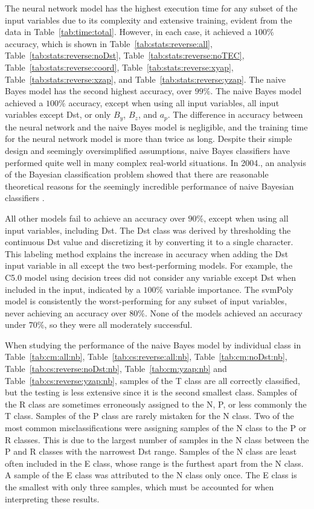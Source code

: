 \documentclass[preprint,12pt]{elsarticle}
\begin{document}
The neural network model has the highest execution time for any subset of the input variables due to its complexity and extensive training, evident from the data in Table~\ref{tab:time:total}. However, in each case, it achieved a $100\%$ accuracy, which is shown in Table~\ref{tab:stats:reverse:all}, Table~\ref{tab:stats:reverse:noDst}, Table~\ref{tab:stats:reverse:noTEC}, Table~\ref{tab:stats:reverse:coord}, Table~\ref{tab:stats:reverse:xyap}, Table~\ref{tab:stats:reverse:xzap}, and Table~\ref{tab:stats:reverse:yzap}. The naive Bayes model has the second highest accuracy, over $99\%$. The naive Bayes model achieved a $100\%$ accuracy, except when using all input variables, all input variables except Dst, or only $B_{y}$, $B_{z}$, and $a_{p}$. The difference in accuracy between the neural network and the naive Bayes model is negligible, and the training time for the neural network model is more than twice as long. Despite their simple design and seemingly oversimplified assumptions, naive Bayes classifiers have performed quite well in many complex real-world situations. In 2004., an analysis of the Bayesian classification problem showed that there are reasonable theoretical reasons for the seemingly incredible performance of naive Bayesian classifiers \cite{Zhang2004}.

All other models fail to achieve an accuracy over $90\%$, except when using all input variables, including Dst. The Dst class was derived by thresholding the continuous Dst value and discretizing it by converting it to a single character. This labeling method explains the increase in accuracy when adding the Dst input variable in all except the two best-performing models. For example, the C5.0 model using decision trees did not consider any variable except Dst when included in the input, indicated by a $100\%$ variable importance. The svmPoly model is consistently the worst-performing for any subset of input variables, never achieving an accuracy over $80\%$. None of the models achieved an accuracy under $70\%$, so they were all moderately successful.

When studying the performance of the naive Bayes model by individual class in Table~\ref{tab:cm:all:nb}, Table~\ref{tab:cs:reverse:all:nb}, Table~\ref{tab:cm:noDst:nb}, Table~\ref{tab:cs:reverse:noDst:nb}, Table~\ref{tab:cm:yzap:nb} and Table~\ref{tab:cs:reverse:yzap:nb}, samples of the T class are all correctly classified, but the testing is less extensive since it is the second smallest class. Samples of the R class are sometimes erroneously assigned to the N, P, or less commonly the T class. Samples of the P class are rarely mistaken for the N class. Two of the most common misclassifications were assigning samples of the N class to the P or R classes. This is due to the largest number of samples in the N class between the P and R classes with the narrowest Dst range. Samples of the N class are least often included in the E class, whose range is the furthest apart from the N class. A sample of the E class was attributed to the N class only once. The E class is the smallest with only three samples, which must be accounted for when interpreting these results.
\end{document}
